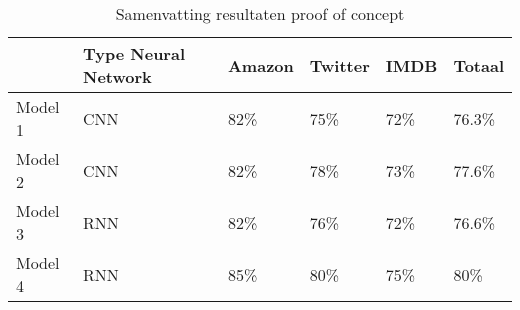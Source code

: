 \begin{table}[htb]
    \centering
    \begin{tabular}{@{}llllll@{}}
        \toprule
        & Type Neural Network & Amazon & Twitter & IMDB & Totaal \\ \midrule
        Model 1 & \gls{CNN}                 & 82\%                  & 75\%                   & 72\%                & 76.3\% \\
        Model 2 & CNN                 & 82\%                  & 78\%                   & 73\%                & 77.6\% \\
        Model 3 & \gls{RNN}                 & 82\%                  & 76\%                   & 72\%                & 76.6\% \\
        Model 4 & RNN                 & 85\%                  & 80\%                   & 75\%                & 80\%   \\ \bottomrule
    \end{tabular}
    \caption{Samenvatting resultaten proof of concept}
    \label{tab:samenvattingproofofconcept}
\end{table}
\FloatBarrier
